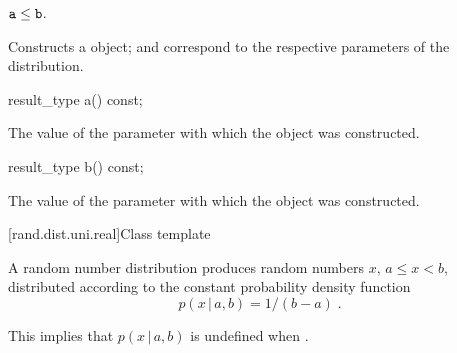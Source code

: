 \begin{itemdescr}
\pnum\requires
 $ \texttt{a} \leq \texttt{b} $.

\pnum\effects Constructs a  object;
  and 
 correspond to the respective parameters of the distribution.
\end{itemdescr}

%
%
\begin{itemdecl}
result_type a() const;
\end{itemdecl}

\begin{itemdescr}
\pnum\returns The value of the  parameter
 with which the object was constructed.
\end{itemdescr}

%
%
\begin{itemdecl}
result_type b() const;
\end{itemdecl}

\begin{itemdescr}
\pnum\returns The value of the  parameter
 with which the object was constructed.
\end{itemdescr}


[rand.dist.uni.real]{Class template }%
%

\pnum
A  random number distribution
produces random numbers $x$,
$ a \leq x < b $,
distributed according to
the constant probability density function%
%
\[%
 p(x\,|\,a,b) = 1 / (b - a)
\; \mbox{.}
\]
\begin{note}
This implies that $p(x\,|\,a,b)$ is undefined when .
\end{note}

